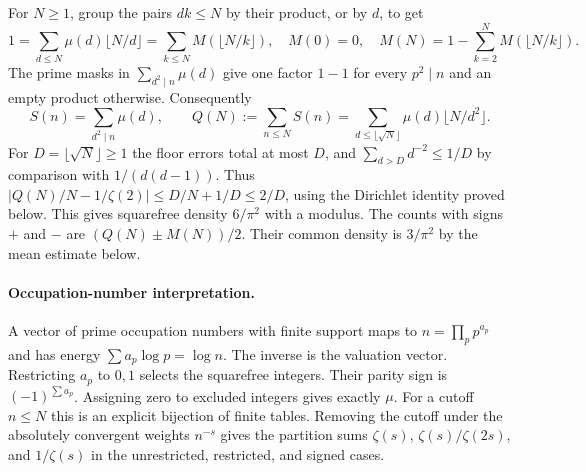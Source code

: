 For $N\ge1$, group the pairs $dk\le N$ by their product, or by $d$, to get
\[
 1=\sum_{d\le N}\mu(d)\lfloor N/d\rfloor
  =\sum_{k\le N}M(\lfloor N/k\rfloor),\quad
 M(0)=0,\quad M(N)=1-\sum_{k=2}^N M(\lfloor N/k\rfloor).
\]
The prime masks in $\sum_{d^2\mid n}\mu(d)$ give one factor $1-1$ for
every $p^2\mid n$ and an empty product otherwise. Consequently
\[
  S(n)=\sum_{d^2\mid n}\mu(d),\qquad
  Q(N):=\sum_{n\le N}S(n)
     =\sum_{d\le\lfloor\sqrt N\rfloor}\mu(d)\lfloor N/d^2\rfloor.
\]
For $D=\lfloor\sqrt N\rfloor\ge1$ the floor errors total at most $D$,
and $\sum_{d>D}d^{-2}\le1/D$ by comparison with
$1/(d(d-1))$. Thus $|Q(N)/N-1/\zeta(2)|\le D/N+1/D\le2/D$,
using the Dirichlet identity proved below. This gives squarefree density
$6/\pi^2$ with a modulus. The counts with signs $+$ and $-$ are
$(Q(N)\pm M(N))/2$. Their common density is $3/\pi^2$ by the mean
estimate below.

\paragraph{Occupation-number interpretation.}
A vector of prime occupation numbers with finite support maps to
$n=\prod_p p^{a_p}$ and has energy $\sum a_p\log p=\log n$.
The inverse is the valuation vector. Restricting $a_p$ to $0,1$ selects
the squarefree integers. Their parity sign is $(-1)^{\sum a_p}$.
Assigning zero to excluded integers gives exactly $\mu$.
For a cutoff $n\le N$ this is an explicit bijection of finite tables.
Removing the cutoff under the absolutely convergent weights $n^{-s}$
gives the partition sums $\zeta(s)$, $\zeta(s)/\zeta(2s)$, and
$1/\zeta(s)$ in the unrestricted, restricted, and signed cases.
